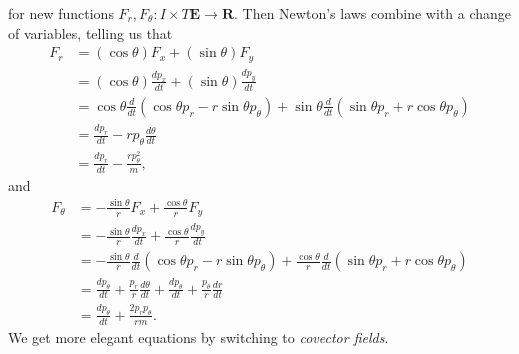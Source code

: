 %
for new functions $F_r,F_\theta: I \times T \mathbf{E} \to \mathbf{R}$. Then Newton's laws combine with a change of variables, telling us that
%
\begin{align*}
    F_r &= (\cos \theta) F_x + (\sin \theta) F_y\\
    &= (\cos \theta) \frac{d p_x}{dt} + (\sin \theta) \frac{d p_y}{dt}\\
    &= \cos \theta \frac{d}{dt} \left( \cos \theta p_r - r \sin \theta p_\theta \right) + \sin \theta \frac{d}{dt} \left( \sin \theta p_r + r \cos \theta p_\theta \right)\\
    &= \frac{dp_r}{dt} - r p_\theta \frac{d\theta}{dt}\\
    &= \frac{dp_r}{dt} - \frac{rp_\theta^2}{m},
\end{align*}
%
and
%
\begin{align*}
    F_\theta &= - \frac{\sin \theta}{r} F_x + \frac{\cos \theta}{r} F_y\\
    &= - \frac{\sin \theta}{r} \frac{dp_x}{dt} + \frac{\cos \theta}{r} \frac{dp_y}{dt}\\
    &= - \frac{\sin \theta}{r} \frac{d}{dt} \left( \cos \theta p_r - r \sin \theta p_\theta \right) + \frac{\cos \theta}{r} \frac{d}{dt} \left( \sin \theta p_r + r \cos \theta p_\theta \right)\\
    &= \frac{dp_\theta}{dt} + \frac{p_r}{r} \frac{d\theta}{dt} + \frac{dp_\theta}{dt} + \frac{p_\theta}{r} \frac{dr}{dt}\\
    &= \frac{dp_\theta}{dt} + \frac{2p_rp_\theta}{rm}.
\end{align*}
%
We get more elegant equations by switching to \emph{covector fields}.

